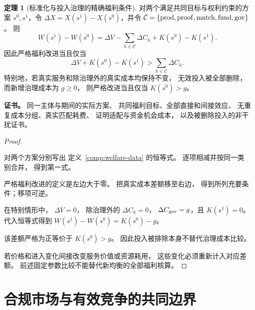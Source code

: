 \documentclass[UTF8,12pt,a4paper,openany,fontset=none,zihao=false]{ctexrep}
\theoremstyle{definition}
\newtheorem{theorem}{定理}[chapter]
\newenvironment{certificate}{\par\noindent\textbf{证书。}\ignorespaces}{\par}
\newcommand{\1}{\mathbf 1}
\begin{document}
\begin{theorem}[标准化与投入治理的精确福利条件]
\label{comp:welfare-condition}
对两个满足共同目标与权利约束的方案
\(s^0,s^1\)，令
\(\Delta X=X(s^1)-X(s^0)\)，并令
\(\mathcal C=\{{\rm prod,proof,match,fund,gov}\}\)。
则
\[
 W(s^1)-W(s^0)
 =\Delta V-\sum_{h\in\mathcal C}\Delta C_h
   +K(s^0)-K(s^1).
\]
因此严格福利改进当且仅当
\[
 \Delta V+K(s^0)-K(s^1)
 >\sum_{h\in\mathcal C}\Delta C_h.
\]
特别地，若真实服务和除治理外的真实成本均保持不变，
无效投入被全部删除，而新增治理成本为 \(g\ge0\)，
则严格改进当且仅当 \(K(s^0)>g\)。
\end{theorem}
\begin{certificate}
同一主体与期间的实际方案、
共同福利目标、全部直接和间接效应、
无重复成本分组、真实匹配耗费、
证明适配与资金机会成本，
以及被删除投入的非干扰证书。
\end{certificate}
\begin{proof}
\begin{semanticsteps}
\item 对两个方案分别写出
定义~\ref{comp:welfare-data} 的恒等式。
逐项相减并按同一类别合并，
得到第一式。
\item 严格福利改进的定义是左边大于零。
把真实成本差额移至右边，
得到所列充要条件；移项可逆。
\item 在特别情形中，
\(\Delta V=0\)，
除治理外的 \(\Delta C_h=0\)，
\(\Delta C_{\rm gov}=g\)，且 \(K(s^1)=0\)。
代入恒等式得到
\(W(s^1)-W(s^0)=K(s^0)-g\)。
\item 该差额严格为正等价于 \(K(s^0)>g\)。
因此投入被排除本身不替代治理成本比较。
\end{semanticsteps}
若价格和进入变化间接改变服务价值或资源耗用，
这些变化必须重新计入对应差额。
前述固定参数比较不能替代新均衡的全部福利核算。
\end{proof}

\section{合规市场与有效竞争的共同边界}
\end{document}
